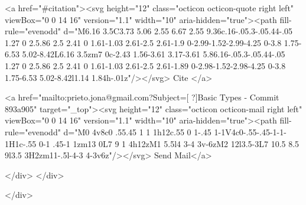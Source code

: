      <a  href="#citation"><svg height="12" class="octicon octicon-quote right left" viewBox="0 0 14 16" version="1.1" width="10" aria-hidden="true"><path fill-rule="evenodd" d="M6.16 3.5C3.73 5.06 2.55 6.67 2.55 9.36c.16-.05.3-.05.44-.05 1.27 0 2.5.86 2.5 2.41 0 1.61-1.03 2.61-2.5 2.61-1.9 0-2.99-1.52-2.99-4.25 0-3.8 1.75-6.53 5.02-8.42L6.16 3.5zm7 0c-2.43 1.56-3.61 3.17-3.61 5.86.16-.05.3-.05.44-.05 1.27 0 2.5.86 2.5 2.41 0 1.61-1.03 2.61-2.5 2.61-1.89 0-2.98-1.52-2.98-4.25 0-3.8 1.75-6.53 5.02-8.42l1.14 1.84h-.01z"/></svg> Cite
      </a>

      <a href="mailto:prieto.jona@gmail.com?Subject=[ ?]Basic Types - Commit 893a905" target="_top"><svg height="12" class="octicon octicon-mail right left" viewBox="0 0 14 16" version="1.1" width="10" aria-hidden="true"><path fill-rule="evenodd" d="M0 4v8c0 .55.45 1 1 1h12c.55 0 1-.45 1-1V4c0-.55-.45-1-1-1H1c-.55 0-1 .45-1 1zm13 0L7 9 1 4h12zM1 5.5l4 3-4 3v-6zM2 12l3.5-3L7 10.5 8.5 9l3.5 3H2zm11-.5l-4-3 4-3v6z"/></svg> Send Mail</a>

    </div>
  </div>

</div>




